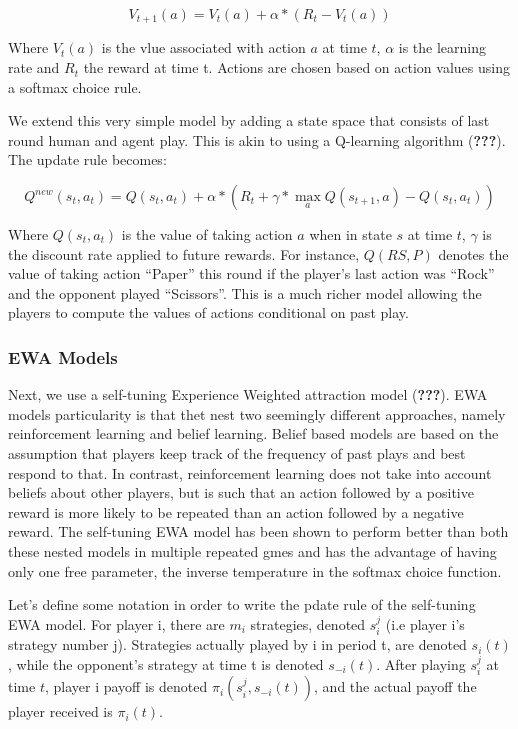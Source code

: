 \documentclass[man,floatsintext]{apa6}
\begin{document}
\[ V_{t+1}(a) = V_{t}(a) + \alpha*( R_{t}  - V_{t}(a)) \]

Where \(V_{t}(a)\) is the vlue associated with action \(a\) at time \(t\), \(\alpha\) is the learning rate and \(R_{t}\) the reward at time t. Actions are chosen based on action values using a softmax choice rule.

We extend this very simple model by adding a state space that consists of last round human and agent play. This is akin to using a Q-learning algorithm ({\textbf{???}}). The update rule becomes:

\[ Q^{new}(s_{t},a_{t}) = Q(s_{t},a_{t}) + \alpha*( R_{t}  + \gamma*\underset{a}{\max}Q(s_{t+1},a) - Q(s_{t},a_{t}) ) \]

Where \(Q(s_{t},a_{t})\) is the value of taking action \(a\) when in state \(s\) at time \(t\), \(\gamma\) is the discount rate applied to future rewards. For instance, \(Q(RS,P)\) denotes the value of taking action \enquote{Paper} this round if the player's last action was \enquote{Rock} and the opponent played \enquote{Scissors}. This is a much richer model allowing the players to compute the values of actions conditional on past play.

\hypertarget{ewa-models}{%
\subsubsection{EWA Models}\label{ewa-models}}

Next, we use a self-tuning Experience Weighted attraction model ({\textbf{???}}). EWA models particularity is that thet nest two seemingly different approaches, namely reinforcement learning and belief learning. Belief based models are based on the assumption that players keep track of the frequency of past plays and best respond to that. In contrast, reinforcement learning does not take into account beliefs about other players, but is such that an action followed by a positive reward is more likely to be repeated than an action followed by a negative reward. The self-tuning EWA model has been shown to perform better than both these nested models in multiple repeated gmes and has the advantage of having only one free parameter, the inverse temperature in the softmax choice function.

Let's define some notation in order to write the pdate rule of the self-tuning EWA model. For player i, there are \(m_{i}\) strategies, denoted \(s_{i}^{j}\) (i.e player i's strategy number j). Strategies actually played by i in period t, are denoted \(s_{i}(t)\), while the opponent's strategy at time t is denoted \(s_{-i}(t)\). After playing \(s_{i}^{j}\) at time \(t\), player i payoff is denoted \(\pi_{i}(s_{i}^{j},s_{-i}(t))\), and the actual payoff the player received is \(\pi_{i}(t)\).
\end{document}
